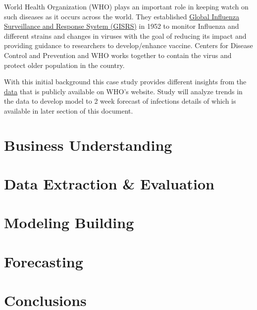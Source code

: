 \documentclass[
]{article}
\begin{document}
World Health Organization (WHO) plays an important role in keeping watch
on such diseases as it occurs across the world. They established
\href{http://www.who.int/influenza/gisrs_laboratory/en/}{Global
Influenza Surveillance and Response System (GISRS)} in 1952 to monitor
Influenza and different strains and changes in viruses with the goal of
reducing its impact and providing guidance to researchers to
develop/enhance vaccine. Centers for Disease Control and Prevention and
WHO works together to contain the virus and protect older population in
the country.

With this initial background this case study provides different insights
from the \href{https://apps.who.int/flumart/Default?ReportNo=12}{data}
that is publicly available on WHO's website. Study will analyze trends
in the data to develop model to 2 week forecast of infections details of
which is available in later section of this document.

\newpage

\hypertarget{business-understanding}{%
\section{Business Understanding}\label{business-understanding}}

\newpage

\hypertarget{data-extraction-evaluation}{%
\section{Data Extraction \&
Evaluation}\label{data-extraction-evaluation}}

\newpage

\hypertarget{modeling-building}{%
\section{Modeling Building}\label{modeling-building}}

\newpage

\hypertarget{forecasting}{%
\section{Forecasting}\label{forecasting}}

\newpage

\hypertarget{conclusions}{%
\section{Conclusions}\label{conclusions}}
\end{document}
